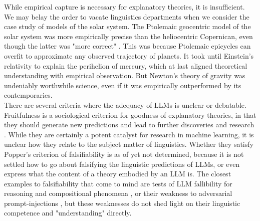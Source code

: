While empirical capture is necessary for explanatory theories, it is insufficient. We may belay the order to vacate linguistics departments when we consider the case study of models of the solar system. The Ptolemaic geocentric model of the solar system was more empirically precise than the heliocentric Copernican, even though the latter was "more correct" \citep{}. This was because Ptolemaic epicycles can overfit to approximate any observed trajectory of planets. It took until Einstein's relativity to explain the perihelion of mercury, which at last aligned theoretical understanding with empirical observation. But Newton's theory of gravity was undeniably worthwhile science, even if it was empirically outperformed by its contemporaries.\\

There are several criteria where the adequacy of LLMs is unclear or debatable. Fruitfulness is a sociological criterion for goodness of explanatory theories, in that they should generate new predictions and lead to further discoveries and research \citep{}. While they are certainly a potent catalyst for research in machine learning, it is unclear how they relate to the subject matter of linguistics. Whether they satisfy Popper's criterion of falsifiability is as of yet not determined, because it is not settled how to go about falsifying the linguistic predictions of LLMs, or even express what the content of a theory embodied by an LLM is. The closest examples to falsifiability that come to mind are tests of LLM fallibility for reasoning and compositional phenomena \citep{}, or their weakness to adversarial prompt-injections \citep{}, but these weaknesses do not shed light on their linguistic competence and "understanding" directly.\\

